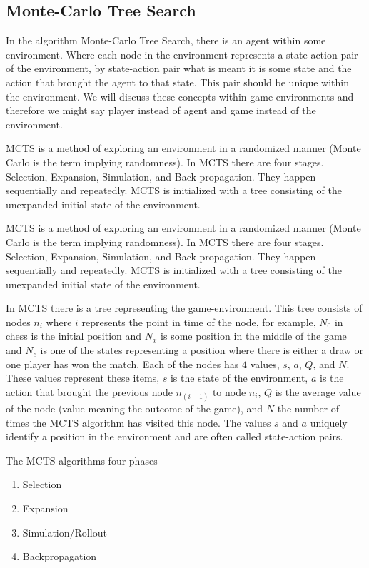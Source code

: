 \subsection{Monte-Carlo Tree Search}

\label{sec:mcts}

In the algorithm Monte-Carlo Tree Search, there is an agent within some environment. Where each node in the environment represents a state-action pair of the environment, by state-action pair what is meant it is some state and the action that brought the agent to that state. This pair should be unique within the environment. We will discuss these concepts within game-environments and therefore we might say player instead of agent and game instead of the environment.

MCTS is a method of exploring an environment in a randomized manner (Monte Carlo is the term implying
randomness). In MCTS there are four stages. Selection, Expansion, Simulation, and Back-propagation. They happen sequentially
and repeatedly. MCTS is initialized with a tree consisting of the unexpanded initial state of the environment.

MCTS is a method of exploring an environment in a randomized manner (Monte Carlo is the term implying randomness). In MCTS there are four stages. Selection, Expansion, Simulation, and Back-propagation. They happen sequentially and repeatedly. MCTS is initialized with a tree consisting of the unexpanded initial state of the environment.

In MCTS there is a tree representing the game-environment. This tree consists of nodes $n_i$ where $i$ represents the point in time of the node, for example, $N_0$ in chess is the initial position and $N_x$ is some position in the middle of the game and $N_e$ is one of the states representing a position where there is either a draw or one player has won the match. Each of the nodes has $4$ values, $s$, $a$, $Q$, and $N$. These values represent these items, $s$ is the state of the environment, $a$ is the action that brought the previous node $n_(i-1)$ to node $n_i$, $Q$ is the average value of the node (value meaning the outcome of the game), and $N$ the number of times the MCTS algorithm has visited this node. The values $s$ and $a$ uniquely identify a position in the environment and are often called state-action pairs.

The MCTS algorithms four phases
\begin{enumerate}
  \item Selection
  \item Expansion
  \item Simulation/Rollout
  \item Backpropagation
\end{enumerate}


